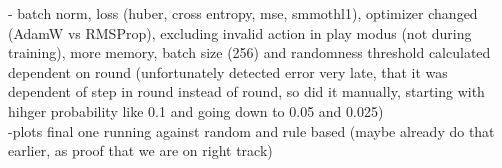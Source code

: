 - batch norm, loss (huber, cross entropy, mse, smmothl1), optimizer changed (AdamW vs RMSProp), excluding invalid action in play modus (not during training), more memory, batch size (256) and randomness threshold calculated dependent on round (unfortunately detected error very late, that it was dependent of step in round instead of round, so did it manually, starting with hihger probability like 0.1 and going down to 0.05 and 0.025)\\
-plots final one running against random and rule based (maybe already do that earlier, as proof that we are on right track)
